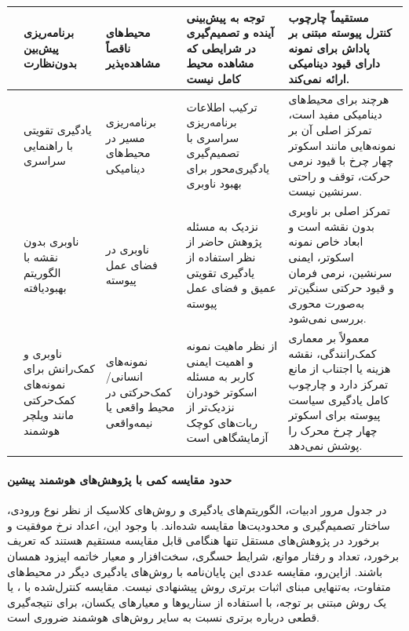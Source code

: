 \begin{longtable}{|C{2.35cm}|P{2.35cm}|P{2.65cm}|P{3.45cm}|P{3.95cm}|}
	\cite{Luo2025UP3} &
	برنامه‌ریزی پیش‌بین بدون‌نظارت  &
	محیط‌های ناقصاً مشاهده‌پذیر &
	توجه به پیش‌بینی آینده و تصمیم‌گیری در شرایطی که مشاهده محیط کامل نیست &
	مستقیماً چارچوب کنترل پیوسته مبتنی بر پاداش برای نمونه دارای قیود دینامیکی ارائه نمی‌کند. \\
	\hline
	
	\cite{Wang2020G2RL} &
	یادگیری تقویتی با راهنمایی سراسری &
	برنامه‌ریزی مسیر در محیط‌های دینامیکی &
	ترکیب اطلاعات برنامه‌ریزی سراسری با تصمیم‌گیری یادگیری‌محور برای بهبود ناوبری &
	هرچند برای محیط‌های دینامیکی مفید است، تمرکز اصلی آن بر نمونه‌هایی مانند اسکوتر چهار چرخ با قیود نرمی حرکت، توقف و راحتی سرنشین نیست. \\
	\hline
	
	\cite{Nasti2025MaplessTD3} &
	ناوبری بدون نقشه با الگوریتم بهبودیافته  &
	ناوبری  در فضای عمل پیوسته &
	نزدیک به مسئله پژوهش حاضر از نظر استفاده از یادگیری تقویتی عمیق و فضای عمل پیوسته &
	تمرکز اصلی بر ناوبری بدون نقشه است و ابعاد خاص نمونه اسکوتر، ایمنی سرنشین، نرمی فرمان و قیود حرکتی سنگین‌تر به‌صورت محوری بررسی نمی‌شود. \\
	\hline
	
	\cite{Pacini2024RLwheelchair,Cui2025OutdoorWheelchair} &
	ناوبری و کمک‌رانش برای نمونه‌های کمک‌حرکتی مانند ویلچر هوشمند &
	نمونه‌های انسانی/کمک‌حرکتی در محیط واقعی یا نیمه‌واقعی &
	از نظر ماهیت نمونه و اهمیت ایمنی کاربر به مسئله اسکوتر خودران نزدیک‌تر از ربات‌های کوچک آزمایشگاهی است &
	معمولاً بر معماری کمک‌رانندگی، نقشه هزینه یا اجتناب از مانع تمرکز دارد و چارچوب کامل یادگیری سیاست پیوسته برای اسکوتر چهار چرخ محرک را پوشش نمی‌دهد. \\
	\hline
	
\end{longtable}

\endgroup

\paragraph{حدود مقایسه کمی با پژوهش‌های هوشمند پیشین}
در جدول مرور ادبیات، الگوریتم‌های یادگیری و روش‌های کلاسیک از نظر نوع ورودی، ساختار تصمیم‌گیری و محدودیت‌ها مقایسه شده‌اند. با وجود این، اعداد نرخ موفقیت و برخورد در پژوهش‌های مستقل تنها هنگامی قابل مقایسه مستقیم هستند که تعریف برخورد، تعداد و رفتار موانع، شرایط حسگری، سخت‌افزار و معیار خاتمه اپیزود همسان باشند. ازاین‌رو، مقایسه عددی این پایان‌نامه با روش‌های یادگیری دیگر در محیط‌های متفاوت، به‌تنهایی مبنای اثبات برتری روش پیشنهادی نیست. مقایسه کنترل‌شده با ،  یا یک روش مبتنی بر توجه، با استفاده از سناریوها و معیارهای یکسان، برای نتیجه‌گیری قطعی درباره برتری نسبت به سایر روش‌های هوشمند ضروری است.

